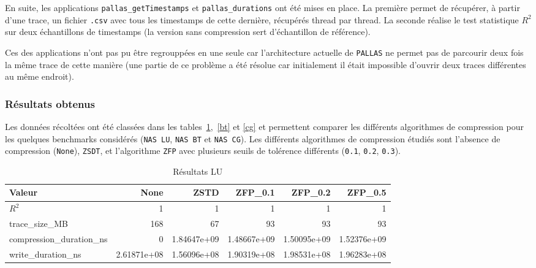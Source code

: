 En suite, les applications \verb!pallas_getTimestamps! et \verb!pallas_durations! ont été mises en place. La première permet de récupérer, à partir d'une trace, un fichier \verb!.csv! avec 
tous les timestamps de cette dernière, récupérés thread par thread. La seconde réalise le test statistique $R^2$ sur deux échantillons de timestamps (la version sans compression sert d'échantillon
de référence).

Ces des applications n'ont pas pu être regrouppées en une seule car l'architecture actuelle de \verb!PALLAS! ne permet pas de parcourir deux fois la même trace de cette manière 
(une partie de ce problème a été résolue car initialement il était impossible d'ouvrir deux traces différentes au même endroit).

\subsubsection{Résultats obtenus}\label{ssec:comp_res}

Les données récoltées ont été classées dans les tables~\ref{lu},~\ref{bt} et \ref{cg} et permettent comparer les différents algorithmes de compression pour les quelques benchmarks considérés
(\verb!NAS LU!, \verb!NAS BT! et \verb!NAS CG!).
Les différents algorithmes de compression étudiés sont l'absence de compression (\verb!None!), \verb!ZSDT!, et l'algorithme \verb!ZFP! avec plusieurs seuils de tolérence différents 
(\verb!0.1!, \verb!0.2!, \verb!0.3!).

\begin{table}[h]
\centering
\caption{Résultats LU}\label{lu}
\begin{adjustbox}{max width=\linewidth}
\begin{tabular}{lrrrrr}
\hline
\textbf{Valeur} & \textbf{None} & \textbf{ZSTD} & \textbf{ZFP\_0.1} & \textbf{ZFP\_0.2} & \textbf{ZFP\_0.5} \\
\hline
$R^2$                     & 1            & 1            & 1             & 1             & 1 \\
trace\_size\_MB           & 168          & 67           & 93            & 93            & 93 \\
compression\_duration\_ns & 0            & 1.84647e+09  & 1.48667e+09   & 1.50095e+09   & 1.52376e+09 \\
write\_duration\_ns       & 2.61871e+08  & 1.56096e+08  & 1.90319e+08   & 1.98531e+08   & 1.96283e+08 \\
\hline
\end{tabular}
\end{adjustbox}
\end{table}

